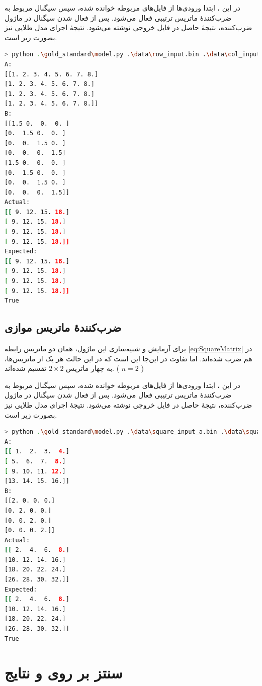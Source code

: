 \documentclass[conference]{IEEEtran-ModifiedForMVIP}
\begin{document}
در این
،
ابتدا ورودی‌ها از فایل‌های مربوطه خوانده شده، سپس سیگنال
مربوط به ضرب‌کنندهٔ ماتریس ترتیبی فعال می‌شود. پس از فعال شدن سیگنال
در ماژول ضرب‌کننده، نتیجهٔ حاصل در فایل خروجی نوشته می‌شود.
نتیجهٔ اجرای مدل طلایی نیز بصورت زیر است.

\begin{latin}
\begin{lstlisting}[language=Bash]
> python .\gold_standard\model.py .\data\row_input.bin .\data\col_input.bin .\sim_out.bin 4 8 4
A:
[[1. 2. 3. 4. 5. 6. 7. 8.]
[1. 2. 3. 4. 5. 6. 7. 8.]
[1. 2. 3. 4. 5. 6. 7. 8.]
[1. 2. 3. 4. 5. 6. 7. 8.]]
B:
[[1.5 0.  0.  0. ]
[0.  1.5 0.  0. ]
[0.  0.  1.5 0. ]
[0.  0.  0.  1.5]
[1.5 0.  0.  0. ]
[0.  1.5 0.  0. ]
[0.  0.  1.5 0. ]
[0.  0.  0.  1.5]]
Actual:
[[ 9. 12. 15. 18.]
[ 9. 12. 15. 18.]
[ 9. 12. 15. 18.]
[ 9. 12. 15. 18.]]
Expected:
[[ 9. 12. 15. 18.]
[ 9. 12. 15. 18.]
[ 9. 12. 15. 18.]
[ 9. 12. 15. 18.]]
True
\end{lstlisting}
\end{latin}
\subsection{
    ضرب‌کنندهٔ ماتریس موازی
}
برای آزمایش و شبیه‌سازی این ماژول، همان دو ماتریس
رابطه 
\ref{eq:SquareMatrix}
در هم ضرب شده‌اند. اما تفاوت در این‌جا این است که در این حالت هر یک از ماتریس‌ها، به چهار ماتریس 
$2 \times 2$
تقسیم شده‌اند.
(
    $n = 2$
)


در این
،
ابتدا ورودی‌ها از فایل‌های مربوطه خوانده شده، سپس سیگنال
مربوط به ضرب‌کنندهٔ ماتریس ترتیبی فعال می‌شود. پس از فعال شدن سیگنال
در ماژول ضرب‌کننده، نتیجهٔ حاصل در فایل خروجی نوشته می‌شود.
نتیجهٔ اجرای مدل طلایی نیز بصورت زیر است.

\begin{latin}
\begin{lstlisting}[language=Bash]
> python .\gold_standard\model.py .\data\square_input_a.bin .\data\square_input_b.bin .\sim_out.bin 4 4 4
A:
[[ 1.  2.  3.  4.]
[ 5.  6.  7.  8.]
[ 9. 10. 11. 12.]
[13. 14. 15. 16.]]
B:
[[2. 0. 0. 0.]
[0. 2. 0. 0.]
[0. 0. 2. 0.]
[0. 0. 0. 2.]]
Actual:
[[ 2.  4.  6.  8.]
[10. 12. 14. 16.]
[18. 20. 22. 24.]
[26. 28. 30. 32.]]
Expected:
[[ 2.  4.  6.  8.]
[10. 12. 14. 16.]
[18. 20. 22. 24.]
[26. 28. 30. 32.]]
True
\end{lstlisting}
\end{latin}

\section{سنتز بر روی
و نتایج}
\end{document}

